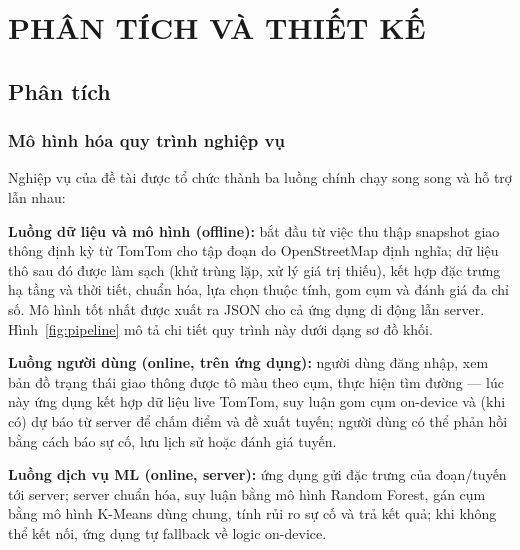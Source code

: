 
\chapter{PHÂN TÍCH VÀ THIẾT KẾ}

\section{Phân tích}

\subsection{Mô hình hóa quy trình nghiệp vụ}
Nghiệp vụ của đề tài được tổ chức thành ba luồng chính chạy song song và hỗ trợ lẫn nhau:

\textbf{Luồng dữ liệu và mô hình (offline):} bắt đầu từ việc thu thập snapshot giao thông định kỳ từ TomTom cho tập đoạn do OpenStreetMap định nghĩa; dữ liệu thô sau đó được làm sạch (khử trùng lặp, xử lý giá trị thiếu), kết hợp đặc trưng hạ tầng và thời tiết, chuẩn hóa, lựa chọn thuộc tính, gom cụm và đánh giá đa chỉ số. Mô hình tốt nhất được xuất ra JSON cho cả ứng dụng di động lẫn server. Hình~\ref{fig:pipeline} mô tả chi tiết quy trình này dưới dạng sơ đồ khối.

\textbf{Luồng người dùng (online, trên ứng dụng):} người dùng đăng nhập, xem bản đồ trạng thái giao thông được tô màu theo cụm, thực hiện tìm đường --- lúc này ứng dụng kết hợp dữ liệu live TomTom, suy luận gom cụm on-device và (khi có) dự báo từ server để chấm điểm và đề xuất tuyến; người dùng có thể phản hồi bằng cách báo sự cố, lưu lịch sử hoặc đánh giá tuyến.

\textbf{Luồng dịch vụ ML (online, server):} ứng dụng gửi đặc trưng của đoạn/tuyến tới server; server chuẩn hóa, suy luận bằng mô hình Random Forest, gán cụm bằng mô hình K-Means dùng chung, tính rủi ro sự cố và trả kết quả; khi không thể kết nối, ứng dụng tự fallback về logic on-device.

